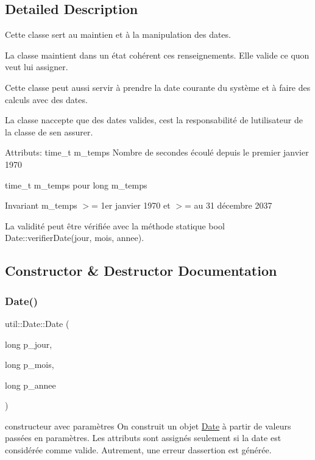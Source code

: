\subsection{Detailed Description}
Cette classe sert au maintien et à la manipulation des dates. 

La classe maintient dans un état cohérent ces renseignements. Elle valide ce qu\textquotesingle{}on veut lui assigner. 

Cette classe peut aussi servir à prendre la date courante du système et à faire des calculs avec des dates. 

La classe n\textquotesingle{}accepte que des dates valides, c\textquotesingle{}est la responsabilité de l\textquotesingle{}utilisateur de la classe de s\textquotesingle{}en assurer. 

Attributs\+: time\+\_\+t m\+\_\+temps Nombre de secondes écoulé depuis le premier janvier 1970 

time\+\_\+t m\+\_\+temps pour long m\+\_\+temps \begin{DoxyInvariant}{Invariant}
m\+\_\+temps $>$= 1er janvier 1970 et $>$= au 31 décembre 2037 

La validité peut être vérifiée avec la méthode statique bool Date\+::verifier\+Date(jour, mois, annee). 
\end{DoxyInvariant}


\subsection{Constructor \& Destructor Documentation}
\mbox{\label{classutil_1_1Date_a06b8340e5beed84c885c89d41a750330}} 
\subsubsection{\texorpdfstring{Date()}{Date()}}
{\footnotesize\ttfamily util\+::\+Date\+::\+Date (\begin{DoxyParamCaption}\item[{long}]{p\+\_\+jour,  }\item[{long}]{p\+\_\+mois,  }\item[{long}]{p\+\_\+annee }\end{DoxyParamCaption})}



constructeur avec paramètres On construit un objet \hyperlink{classutil_1_1Date}{Date} à partir de valeurs passées en paramètres. Les attributs sont assignés seulement si la date est considérée comme valide. Autrement, une erreur d\textquotesingle{}assertion est générée. 


